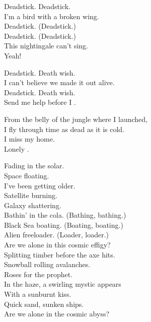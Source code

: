 
Deadstick. Deadstick. \\
I'm a bird with a broken wing. \\
Deadstick. (Deadstick.) \\
Deadstick. (Deadstick.) \\
This nightingale can't sing. \\
Yeah! \\


Deadstick. Death wish. \\
I can't believe we made it out alive. \\
Deadstick. Death wish. \\
Send me help before I . \\





From the belly of the jungle where I launched, \\
I fly through time as dead as it is cold. \\
I miss my home. \\
Lonely . \\


Fading in the solar. \\
Space  floating. \\
I've been getting older. \\
Satellite burning. \\
Galaxy shattering. \\

Bathin' in the cola. (Bathing, bathing.) \\
Black Sea boating. (Boating, boating.) \\
Alien freeloader. (Loader, loader.) \\
Are we alone in this cosmic effigy? \\

Splitting timber before the axe hits. \\
Snowball rolling avalanches. \\
Roses for the prophet. \\
In the haze, a swirling mystic appears \\
With a sunburnt kiss. \\
Quick sand, sunken ships. \\
Are we alone in the cosmic abyss? \\

